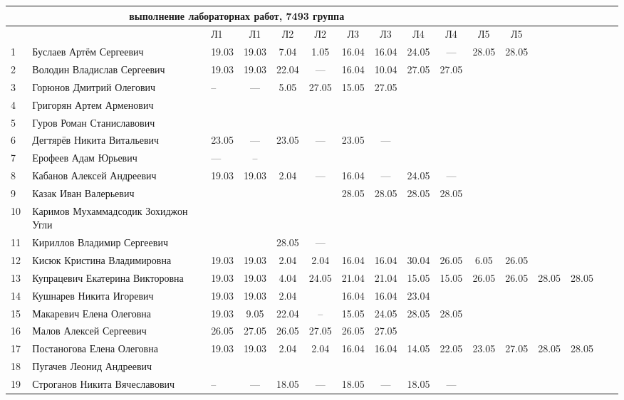 \documentclass[a4paper,11pt]{article}
\begin{document}
%
\hspace{-6.1cm} %
\begin{tabular}{l|llccccccccccccc}
\multicolumn{10}{c}{выполнение лабораторнах работ, 7493 группа} \\
\toprule
&&Л1&Л1& Л2&Л2& Л3&Л3& Л4&Л4& Л5&Л5\\ 
\midrule
1\,&Буслаев Артём Сергеевич               &19.03&19.03& 7.04& 1.05&16.04&16.04&24.05& --- &28.05&28.05\\
2\,&Володин Владислав Сергеевич           &19.03&19.03&22.04& --- &16.04&10.04&27.05&27.05\\
3\,&Горюнов Дмитрий Олегович              &--   &---  & 5.05&27.05&15.05&27.05&&\\
4\,&Григорян Артем Арменович              &&&&&&&&\\
5\,&Гуров Роман Станиславович             &&&&&&&&\\
\midrule
6\,&Дегтярёв Никита Витальевич            &23.05& --- &23.05& --- &23.05& --- &&\\
7\,&Ерофеев Адам Юрьевич                  &---&--&&&&&&\\
8\,&Кабанов Алексей Андреевич             &19.03&19.03&2.04& --- &16.04& --- &24.05& ---\\
9\,&Казак Иван Валерьевич                 &     &     &     &     &28.05&28.05&28.05&28.05\\
10\,&Каримов Мухаммадсодик Зохиджон Угли  &&&&&&&&\\
\midrule
11\,&Кириллов Владимир Сергеевич          &     &     &28.05& ---&&&&\\
12\,&Кисюк Кристина Владимировна          &19.03&19.03&2.04 &2.04&16.04&16.04 &30.04&26.05&6.05&26.05\\
13\,&Купрацевич Екатерина Викторовна      &19.03&19.03& 4.04&24.05&21.04&21.04&15.05&15.05&26.05&26.05&28.05&28.05\\
14\,&Кушнарев Никита Игоревич             &19.03&19.03& 2.04&     &16.04&16.04&23.04&\\
15\,&Макаревич Елена Олеговна             &19.03& 9.05&22.04& --  &15.05&24.05&28.05&28.05\\
\midrule
16\,&Малов Алексей Сергеевич              &26.05&27.05&26.05&27.05&26.05&27.05&&\\
17\,&Постаногова Елена Олеговна           &19.03&19.03&2.04&2.04&16.04&16.04&14.05&22.05&23.05&27.05&28.05&28.05\\
18\,&Пугачев Леонид Андреевич             &&&&&&&&\\
19\,&Строганов Никита Вячеславович        &--&---&18.05& --- &18.05& --- &18.05& ---\\

\bottomrule
\end{tabular}
\end{document}
